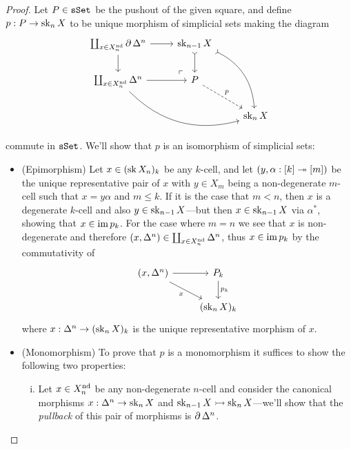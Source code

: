 \begin{proof}
Let \(P \in {\texttt{sSet}}\) be the pushout of the given square, and define
\(p: P \to \operatorname{sk}_n X\) to be unique morphism of simplicial sets making the diagram
\[
\begin{tikzcd}
\coprod_{x \in X_n^{\Nondeg}} \Bd \Delta^n
\ar[rd, phantom, very near end, "\ulcorner"]
\ar[r] \ar[d]
&\Sk_{n-1} X
\ar[d, tail]
\ar[rdd, tail, bend left]
&
\\
\coprod_{x \in X_n^{\Nondeg}} \Delta^n
\ar[rrd, bend right]
\ar[r]
&P \ar[rd, dashed, "p"]
&
\\
&&\Sk_n X
\end{tikzcd}
\]
commute in \({\texttt{sSet}}\). We'll show that \(p\) is an isomorphism of simplicial
sets:
\begin{itemize}\setlength\itemsep{0em}
\item (Epimorphism) Let \(x \in (\operatorname{sk} X_n)_k\) be any \(k\)-cell, and let
  \((y, \alpha: [k] \twoheadrightarrow [m])\) be the unique representative pair of \(x\) with
  \(y \in X_m\) being a non-degenerate \(m\)-cell such that
  \(x = y \alpha\) and \(m \leq k\). If it is the case that \(m < n\), then
  \(x\) is a degenerate \(k\)-cell and also \(y \in \operatorname{sk}_{n-1} X\)---but then
  \(x \in \operatorname{sk}_{n-1} X\) via \(\alpha^{*}\), showing that \(x \in \operatorname{im} p_k\). For
  the case where \(m = n\) we see that \(x\) is non-degenerate and therefore
  \((x, \Delta^n) \in \coprod_{x \in X_n^{\operatorname{nd}}} \Delta^n\), thus
  \(x \in \operatorname{im} p_k\) by the commutativity of
  \[
  \begin{tikzcd}
  {(x, \splx^n)}
  \ar[r]
  \ar[rd, "x"']
  &P_k \ar[d, "p_k"] \\
  &{(\Sk_n X)_{k}}
  \end{tikzcd}
  \]
  where \(x: \Delta^n \to (\operatorname{sk}_n X)_k\) is the unique representative morphism of
  \(x\).

\item (Monomorphism) To prove that \(p\) is a monomorphism it suffices to show
  the following two properties:
  \begin{enumerate}[(i)]\setlength\itemsep{0em}
\item Let \(x \in X_n^{\operatorname{nd}}\) be any non-degenerate \(n\)-cell and consider
  the canonical morphisms \(x: \Delta^n \to \operatorname{sk}_n X\) and
  \(\operatorname{sk}_{n-1} X \rightarrowtail \operatorname{sk}_n X\)---we'll show that the \emph{pullback} of this
  pair of morphisms is \(\operatorname{\partial} \Delta^n\).


\end{enumerate}
\end{itemize}
\end{proof}
